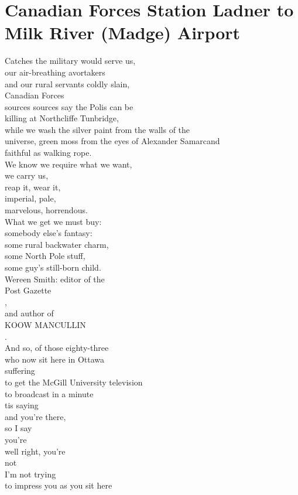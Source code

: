\documentclass[smalldemyvopaper,11pt,twoside,onecolumn,openright,extrafontsizes]{memoir}
\begin{document}
\chapter{Canadian Forces Station Ladner to Milk River (Madge) Airport}
Catches the military would serve us,
\\our air-breathing avortakers
\\and our rural servants coldly slain,
\\Canadian Forces
\\sources sources say the Polis can be
\\killing at Northcliffe Tunbridge,
\\while we wash the silver paint from the walls of the
\\universe, green moss from the eyes of Alexander Samarcand
\\faithful as walking rope.
\\We know we require what we want,
\\we carry us,
\\reap it, wear it,
\\imperial, pale,
\\marvelous, horrendous.
\\What we get we must buy:
\\somebody else's fantasy:
\\some rural backwater charm,
\\some North Pole stuff,
\\some guy's still-born child.
\\Wereen Smith: editor of the
\\Post Gazette
\\,
\\and author of
\\KOOW MANCULLIN
\\.
\\And so, of those eighty-three
\\who now sit here in Ottawa
\\suffering
\\to get the McGill University television
\\to broadcast in a minute
\\tis saying
\\and you're there,
\\so I say
\\you're
\\well right, you're
\\not
\\I'm not trying
\\to impress you as you sit here
\end{document}
